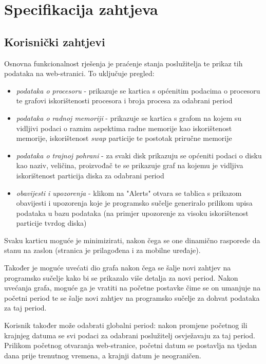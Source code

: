 \documentclass[zavrsnirad]{fer}
\begin{document}
\chapter{Specifikacija zahtjeva}
\label{pog:specifikacija_zahtjeva}

\section{Korisnički zahtjevi}
Osnovna funkcionalnost rješenja je praćenje stanja poslužitelja te prikaz tih podataka na web-stranici.
To uključuje pregled:
\begin{itemize}
	\item \textit{podataka o procesoru} - prikazuje se kartica s općenitim podacima o procesoru te grafovi iskorištenosti procesora i broja procesa za odabrani period
	\item \textit{podataka o radnoj memoriji} - prikazuje se kartica s grafom na kojem su vidljivi podaci o raznim aspektima radne memorije kao iskorištenost memorije, iskorištenost \textit{swap} particije te postotak priručne memorije
	\item \textit{podataka o trajnoj pohrani} - za svaki disk prikazuju se općeniti podaci o disku kao naziv, veličina, proizvođač te se prikazuje graf na kojemu je vidljiva iskorištenost particija diska za odabrani period
	\item \textit{obavijesti i upozorenja} - klikom na "Alerts" otvara se tablica s prikazom obavijesti i upozorenja koje je programsko sučelje generiralo prilikom upisa podataka u bazu podataka (na primjer upozorenje za visoku iskorištenost particije tvrdog diska)
\end{itemize}

Svaku karticu moguće je minimizirati, nakon čega se one dinamično rasporede da stanu na zaslon (stranica je prilagođena i za mobilne uređaje).

Također je moguće uvećati dio grafa nakon čega se šalje novi zahtjev na programsko sučelje kako bi se prikazalo više detalja za novi period. Nakon uvećanja grafa, moguće ga je vratiti na početne postavke čime se on umanjuje na početni period te se šalje novi zahtjev na programsko sučelje za dohvat podataka za taj period.

Korisnik također može odabrati globalni period: nakon promjene početnog ili krajnjeg datuma se svi podaci za odabrani poslužitelj osvježavaju za taj period. Prilikom početnog otvaranja web-stranice, početni datum se postavlja na tjedan dana prije trenutnog vremena, a krajnji datum je neograničen.
\end{document}

